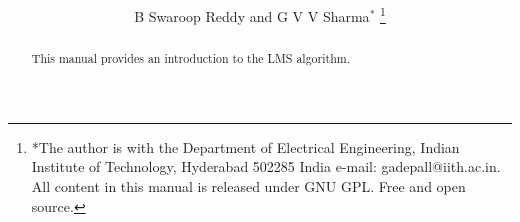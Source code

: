 \documentclass[journal,12pt,twocolumn]{IEEEtran}
\renewcommand\thesection{\arabic{section}}
\begin{document}
\let\StandardTheFigure\thefigure
\renewcommand{\thefigure}{\thesection}



\makeatletter
{}
\makeatother

\let\StandardTheFigure\thefigure
\let\StandardTheTable\thetable





\def\putbox#1#2#3{\makebox[0in][l]{\makebox[#1][l]{}\raisebox{\baselineskip}[0in][0in]{\raisebox{#2}[0in][0in]{#3}}}}
     \def\rightbox#1{\makebox[0in][r]{#1}}
     \def\centbox#1{\makebox[0in]{#1}}
     \def\topbox#1{\raisebox{-\baselineskip}[0in][0in]{#1}}
     \def\midbox#1{\raisebox{-0.5\baselineskip}[0in][0in]{#1}}

\vspace{3cm}

\title{ 
}

\author{B Swaroop Reddy and G V V Sharma$^{*}$%
	\thanks{*The author is with the Department
		of Electrical Engineering, Indian Institute of Technology, Hyderabad
		502285 India e-mail:  gadepall@iith.ac.in. All content in this manual is released under GNU GPL.  Free and open source.}
	
}	

\maketitle

\tableofcontents

\bigskip

\renewcommand{\thefigure}{\theenumi}
\renewcommand{\thetable}{\theenumi}


\begin{abstract}
	
This manual provides an introduction to the LMS algorithm.
		
\end{abstract}
\end{document}
